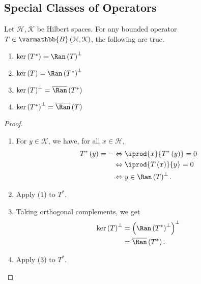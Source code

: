 \documentclass[10pt]{mypackage}
\renewcommand*{\mathbb}[1]{\varmathbb{#1}}
\newcommand{\B}{\mathbb{B}}
\begin{document}
\subsection{Special Classes of Operators}%
\begin{lemma}
  Let $\mathcal{H},\mathcal{K}$ be Hilbert spaces. For any bounded operator $T \in \B\left(\mathcal{H},\mathcal{K}\right)$, the following are true.
  \begin{enumerate}[(1)]
    \item $\ker\left(T^{\ast}\right) = \Ran\left(T\right)^{\perp}$
    \item $\ker\left(T\right) = \Ran\left(T^{\ast}\right)^{\perp}$
    \item $\ker\left(T\right)^{\perp} = \overline{\Ran}\left(T^{\ast}\right)$
    \item $\ker\left(T^{\ast}\right)^{\perp} = \overline{\Ran}\left(T\right)$
  \end{enumerate}
\end{lemma}
\begin{proof}\hfill
  \begin{enumerate}[(1)]
    \item For $y\in \mathcal{K}$, we have, for all $x\in \mathcal{H}$,
      \begin{align*}
        T^{\ast}\left(y\right) = - &\Leftrightarrow \iprod{x}{T^{\ast}\left(y\right)} = 0\\
                                   &\Leftrightarrow \iprod{T\left(x\right)}{y} = 0\\
                                   &\Leftrightarrow y\in \Ran\left(T\right)^{\perp}.
      \end{align*}
    \item Apply (1) to $T^{\ast}$.
    \item Taking orthogonal complements, we get
      \begin{align*}
        \ker\left(T\right)^{\perp} &= \left(\Ran\left(T^{\ast}\right)^{\perp}\right)^{\perp}\\
                                   &= \overline{\Ran}\left(T^{\ast}\right).
      \end{align*}
    \item Apply (3) to $T^{\ast}$.
  \end{enumerate}
\end{proof}
\end{document}
